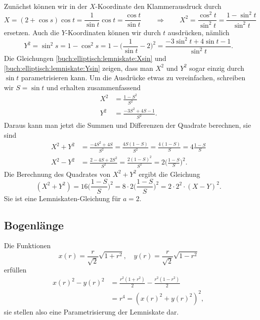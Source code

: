 Zunächst können wir in der $X$-Koordinate den Klammerausdruck durch 
\begin{equation}
X
=
(2+\cos s) \cos t
=
\frac{1}{\sin t}\cos t
=
\frac{\cos t}{\sin t}
\qquad\Rightarrow\qquad
X^2
=
\frac{\cos^2t}{\sin^2 t}
=
\frac{1-\sin^2t}{\sin^2 t}
\label{buch:elliptisch:lemniskate:Xsin}
\end{equation}
ersetzen.
Auch die $Y$-Koordinaten können wir durch $t$ ausdrücken, 
nämlich
\begin{equation}
Y^2=\sin^2 s = 1-\cos^2 s
=
1-
\biggl(
\frac{1}{\sin t}
-2
\biggr)^2
=
\frac{-3\sin^2 t+4\sin t-1}{\sin^2 t}.
\label{buch:elliptisch:lemniskate:Ysin}
\end{equation}
Die Gleichungen
\eqref{buch:elliptisch:lemniskate:Xsin}
und
\eqref{buch:elliptisch:lemniskate:Ysin}
zeigen, dass man $X^2$ und $Y^2$ sogar einzig durch $\sin t$ 
parametrisieren kann.
Um die Ausdrücke etwas zu vereinfachen, schreiben wir $S=\sin t$
und erhalten zusammenfassend
\begin{equation}
\begin{aligned}
X^2
&=
\frac{1-S^2}{S^2}
\\
Y^2
&=
\frac{-3S^2+4S-1}{S^2}.
\end{aligned}
\end{equation}
Daraus kann man jetzt die Summen und Differenzen der Quadrate
berechnen, sie sind
\begin{equation}
\begin{aligned}
X^2+Y^2
&=
\frac{-4S^2+4S}{S^2}
=
\frac{4S(1-S)}{S^2}
=
\frac{4(1-S)}{S}
=
4\frac{1-S}{S}
\\
X^2-Y^2
&=
\frac{2-4S+2S^2}{S^2}
=
\frac{2(1-S)^2}{S^2}
=
2\biggl(\frac{1-S}{S}\biggr)^2.
\end{aligned}
\end{equation}
Die Berechnung des Quadrates von $X^2+Y^2$ ergibt
die Gleichung
\[
(X^2+Y^2)
=
16
\biggl(\frac{1-S}{S}\biggr)^2
=
8 \cdot 2
\biggl(\frac{1-S}{S}\biggr)^2
=
2\cdot 2^2\cdot (X-Y)^2.
\]
Sie ist eine Lemniskaten-Gleichung für $a=2$.

%
%
\subsection{Bogenlänge}
Die Funktionen
\begin{equation}
x(r) = \frac{r}{\sqrt{2}}\sqrt{1+r^2},
\quad
y(r) = \frac{r}{\sqrt{2}}\sqrt{1-r^2}
\label{buch:geometrie:eqn:lemniskateparam}
\end{equation}
erfüllen
\begin{align*}
x(r)^2-y(r)^2
&=
\frac{r^2(1+r^2)}{2}-\frac{r^2(1-r^2)}{2}
\\
&
=
r^4
=
(x(r)^2 + y(r)^2)^2,
\end{align*}
sie stellen also eine Parametrisierung der Lemniskate dar.

